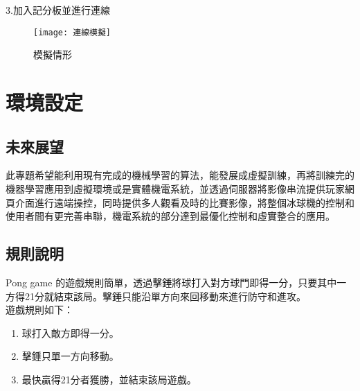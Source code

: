 3.加入記分板並進行連線\\
\begin{figure}[hbt!]
\begin{center}
\texttt{[image: 連線模擬]}
\caption{\Large 模擬情形}\label{fig.連線模擬}
\end{center}
\end{figure}
\newpage
 
 \chapter{環境設定}
\renewcommand{\baselinestretch}{10.0} %
\setcounter{page}{1}  %
\fontsize{14pt}{2.5pt}\sectionef

\section{未來展望}
此專題希望能利用現有完成的機械學習的算法，能發展成虛擬訓練，再將訓練完的機器學習應用到虛擬環境或是實體機電系統，並透過伺服器將影像串流提供玩家網頁介面進行遠端操控，同時提供多人觀看及時的比賽影像，將整個冰球機的控制和使用者間有更完善串聯，機電系統的部分達到最優化控制和虛實整合的應用。
\section{規則說明}
 Pong game 的遊戲規則簡單，透過擊錘將球打入對方球門即得一分，只要其中一方得21分就結束該局。擊錘只能沿單方向來回移動來進行防守和進攻。\\
遊戲規則如下：
\begin{enumerate}
\item 球打入敵方即得一分。
\item 擊錘只單一方向移動。
\item 最快贏得21分者獲勝，並結束該局遊戲。
\end{enumerate}

\renewcommand{\baselinestretch}{0.5} %